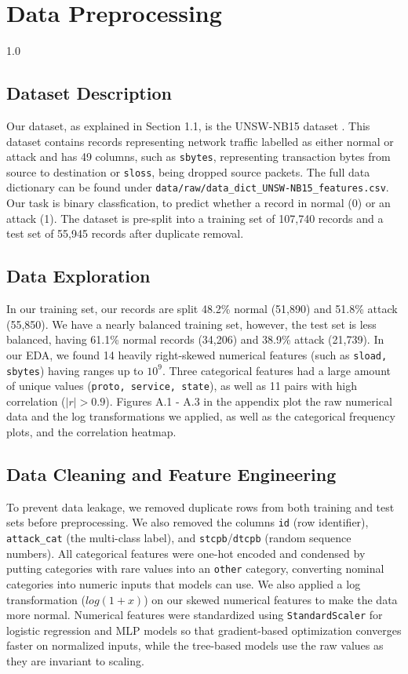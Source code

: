 \chapter{Data Preprocessing}
\begin{spacing}{1.0}
\small

\section{Dataset Description}

Our dataset, as explained in Section 1.1, is the UNSW-NB15 dataset \cite{kaggle_unsw_nb15}. This dataset contains records representing network traffic labelled as either normal or attack and has 49 columns, such as \texttt{sbytes}, representing transaction bytes from source to destination or \texttt{sloss}, being dropped source packets. The full data dictionary can be found under \texttt{data/raw/data\_dict\_UNSW-NB15\_features.csv}. Our task is binary classfication, to predict whether a record in normal (0) or an attack (1). The dataset is pre-split into a training set of 107,740 records and a test set of 55,945 records after duplicate removal.

\section{Data Exploration}

In our training set, our records are split 48.2\% normal (51,890) and 51.8\% attack (55,850). We have a nearly balanced training set, however, the test set is less balanced, having 61.1\% normal records (34,206) and 38.9\% attack (21,739). In our EDA, we found 14 heavily right-skewed numerical features (such as \texttt{sload, sbytes}) having ranges up to $10^9$. Three categorical features had a large amount of unique values (\texttt{proto, service, state}), as well as 11 pairs with high correlation ($|r| > 0.9$). Figures A.1 - A.3 in the appendix plot the raw numerical data and the log transformations we applied, as well as the categorical frequency plots, and the correlation heatmap.

\section{Data Cleaning and Feature Engineering}

To prevent data leakage, we removed duplicate rows from both training and test sets before preprocessing. We also removed the columns \texttt{id} (row identifier), \texttt{attack\_cat} (the multi-class label), and \texttt{stcpb}/\texttt{dtcpb} (random sequence numbers). All categorical features were one-hot encoded and condensed by putting categories with rare values into an \texttt{other} category, converting nominal categories into numeric inputs that models can use. We also applied a log transformation ($log(1 + x)$) on our skewed numerical features to make the data more normal. Numerical features were standardized using \texttt{StandardScaler} for logistic regression and MLP models so that gradient-based optimization converges faster on normalized inputs, while the tree-based models use the raw values as they are invariant to scaling.


\end{spacing}
